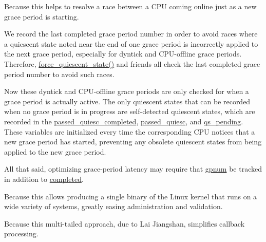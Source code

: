 
	Because this helps to resolve a race between a CPU coming online
	just as a new grace period is starting.


	We record the last completed grace period number in order
	to avoid races where a quiescent state noted near the end of
	one grace period is incorrectly applied to the next grace
	period, especially for dyntick and CPU-offline grace periods.
	Therefore, \url{force_quiescent_state()} and friends all
	check the last completed grace period number to avoid such races.

	Now these dyntick and CPU-offline grace periods are only checked
	for when a grace period is actually active.
	The only quiescent states that can be recorded when no grace
	period is in progress are self-detected quiescent states,
	which are recorded in the \url{passed_quiesc_completed},
	\url{passed_quiesc}, and \url{qs_pending}.
	These variables are initialized every time the corresponding
	CPU notices that a new grace period has started, preventing
	any obsolete quiescent states from being applied to the
	new grace period.

	All that said, optimizing grace-period latency may require that
	\url{gpnum} be tracked in addition to \url{completed}.


	Because this allows producing a single binary of the Linux kernel
	that runs on a wide variety of systems, greatly easing administration
	and validation.


	Because this multi-tailed approach, due to Lai Jiangshan,
	simplifies callback processing.


